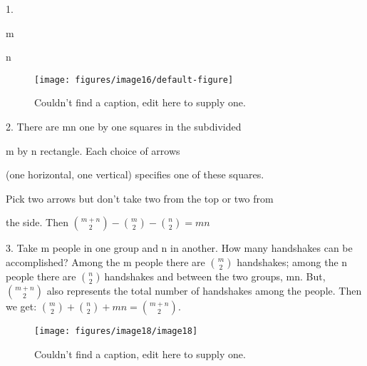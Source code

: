 1.

m

n
\begin{figure}[h!]\begin{center}
\texttt{[image: figures/image16/default-figure]}
\caption{{Couldn't find a caption, edit here to supply one.%
}}
\end{center}
\end{figure}

2.
There are mn one by one squares in the subdivided

m by n rectangle. Each choice of arrows

(one horizontal, one vertical) specifies one of these squares.

Pick two arrows but don't take two from the top or two from

the side. Then \(\binom{m + n}{2}
 -
\binom{m}{2}
 -
\binom{n}{2}
 = mn\)

3. Take m people in one group and n in another. How many handshakes can
be accomplished? Among the m people there are \(\binom{m}{2}
\) handshakes; among the n people there are
\(\binom{n}{2}
\ \)handshakes and between the two groups, mn. But,
\(\binom{m + n}{2}
\) also represents the total number of handshakes among the
people. Then we get: \(\binom{m}{2}
 +
\binom{n}{2}
 + mn =
\binom{m + n}{2}
\).
\begin{figure}[h!]\begin{center}
\texttt{[image: figures/image18/image18]}
\caption{{Couldn't find a caption, edit here to supply one.%
}}
\end{center}
\end{figure}



